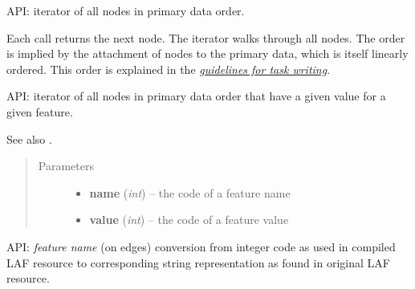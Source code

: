 \documentclass[letterpaper,10pt,english]{sphinxmanual}
\begin{document}
\begin{fulllineitems}
\begin{fulllineitems}
\end{fulllineitems}


\begin{fulllineitems}
\label{graf/graf:graf.GrafTask.next_node}
API: iterator of all nodes in primary data order.

Each call returns the next node. The iterator walks through all nodes.
The order is implied by the attachment of nodes to the primary data,
which is itself linearly ordered.
This order is explained in the {\hyperref[taskwriting:node-order]{\emph{guidelines for task writing}}}.

\end{fulllineitems}


\begin{fulllineitems}
\label{graf/graf:graf.GrafTask.next_node_with_fval}
API: iterator of all nodes in primary data order that have a
given value for a given feature.

See also {\hyperref[graf/graf:graf.GrafTask.next_node]{}}.
\begin{quote}\begin{description}
\item[{Parameters}] \leavevmode\begin{itemize}
\item {} 
\textbf{name} (\emph{int}) --
the code of a feature name

\item {} 
\textbf{value} (\emph{int}) --
the code of a feature value

\end{itemize}

\end{description}\end{quote}

\end{fulllineitems}


\begin{fulllineitems}
\label{graf/graf:graf.GrafTask.rep_fname_edge}
API: \emph{feature name} (on edges) conversion from integer code as used in compiled LAF resource
to corresponding string representation as found in original LAF resource.


\end{fulllineitems}
\end{fulllineitems}
\end{document}
